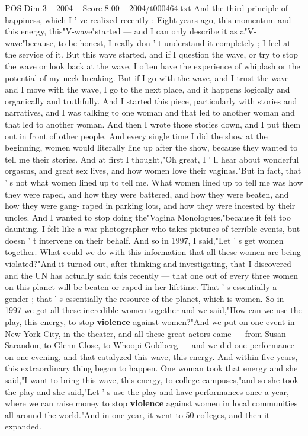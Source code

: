 \begin{textsample}{POS Dim 3 – 2004 – Score 8.00 – 2004/t000464.txt}
And the third principle of happiness, which I ' ve realized recently : Eight years ago, this momentum and this energy, this"V-wave"started — and I can only describe it as a"V-wave"because, to be honest, I really don ' t understand it completely ; I feel at the service of it.
But this wave started, and if I question the wave, or try to stop the wave or look back at the wave, I often have the experience of whiplash or the potential of my neck breaking.
But if I go with the wave, and I trust the wave and I move with the wave, I go to the next place, and it happens logically and organically and truthfully.
And I started this piece, particularly with stories and narratives, and I was talking to one woman and that led to another woman and that led to another woman.
And then I wrote those stories down, and I put them out in front of other people.
And every single time I did the show at the beginning, women would literally line up after the show, because they wanted to tell me their stories.
And at first I thought,"Oh great, I ' ll hear about wonderful orgasms, and great sex lives, and how women love their vaginas."But in fact, that ' s not what women lined up to tell me.
What women lined up to tell me was how they were raped, and how they were battered, and how they were beaten, and how they were gang- raped in parking lots, and how they were incested by their uncles.
And I wanted to stop doing the"Vagina Monologues,"because it felt too daunting.
I felt like a war photographer who takes pictures of terrible events, but doesn ' t intervene on their behalf.
And so in 1997, I said,"Let ' s get women together.
What could we do with this information that all these women are being violated?"And it turned out, after thinking and investigating, that I discovered — and the UN has actually said this recently — that one out of every three women on this planet will be beaten or raped in her lifetime.
That ' s essentially a gender ; that ' s essentially the resource of the planet, which is women.
So in 1997 we got all these incredible women together and we said,"How can we use the play, this energy, to stop \textbf{violence} against women?"And we put on one event in New York City, in the theater, and all these great actors came — from Susan Sarandon, to Glenn Close, to Whoopi Goldberg — and we did one performance on one evening, and that catalyzed this wave, this energy.
And within five years, this extraordinary thing began to happen.
One woman took that energy and she said,"I want to bring this wave, this energy, to college campuses,"and so she took the play and she said,"Let ' s use the play and have performances once a year, where we can raise money to stop \textbf{violence} against women in local communities all around the world."And in one year, it went to 50 colleges, and then it expanded.

\end{textsample}
